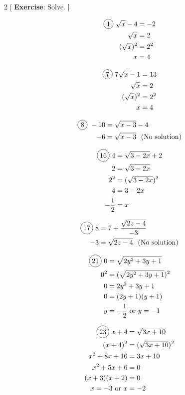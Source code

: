 \vspace{.5cm}

\begin{multicols}{2}
[
  \textbf{Exercise}: Solve.
]

\begin{align*}
  \circled{1}\ \sqrt{x}-4&=-2\\
  \sqrt{x}&=2\\
  (\sqrt{x})^{2}&=2^{2}\\
  x&=4
\end{align*}

\begin{align*}
  \circled{7}\ 7\sqrt{x}-1&=13\\
  \sqrt{x}&=2\\
  (\sqrt{x})^{2}&=2^{2}\\
  x&=4
\end{align*}

\begin{align*}
  \circled{8}\ -10&=\sqrt{x-3}-4\\
  -6&=\sqrt{x-3}\ \text{ (No solution)}\\
\end{align*}

\begin{align*}
  \circled{16}\ 4&=\sqrt{3-2x}+2\\
  2&=\sqrt{3-2x}\\
  2^{2}&=(\sqrt{3-2x})^{2}\\
  4&=3-2x\\
  -\frac{1}{2}&=x
\end{align*}

\begin{align*}
  \circled{17}\ 8&=7+\frac{\sqrt{2z-4}}{-3}\\
  -3&=\sqrt{2z-4}\ \text{ (No solution)}\\
\end{align*}

\begin{align*}
  \circled{21}\ 0&=\sqrt{2y^{2}+3y+1}\\
  0^{2}&=(\sqrt{2y^{2}+3y+1})^{2}\\
  0&=2y^{2}+3y+1\\
  0&=(2y+1)(y+1)\\
  y&=-\frac{1}{2} \text{ or } y=-1
\end{align*}

\begin{align*}
  \circled{23}\ x+4&=\sqrt{3x+10}\\
  (x+4)^{2}&=(\sqrt{3x+10})^{2}\\
  x^{2}+8x+16&=3x+10\\
  x^{2}+5x+6&=0\\
  (x+3)(x+2)&=0\\
  x=-3 \text{ or } x&=-2
\end{align*}


\end{multicols}
